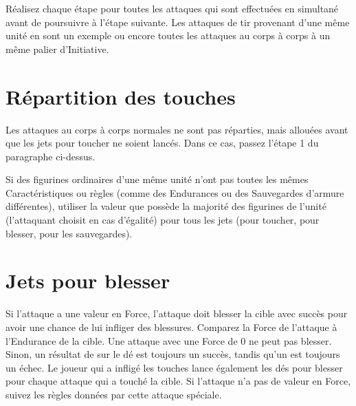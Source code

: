 Réalisez chaque étape pour toutes les attaques qui sont effectuées en simultané avant de poursuivre à l'étape suivante. Les attaques de tir provenant d'une même unité en sont un exemple ou encore toutes les attaques au corps à corps à un même palier d'Initiative.

\section{Répartition des touches}


Les attaques au corps à corps normales ne sont pas réparties, mais allouées avant que les jets pour toucher ne soient lancés. Dans ce cas, passez l'étape 1 du paragraphe ci-dessus. 

Si des figurines ordinaires d'une même unité n'ont pas toutes les mêmes Caractéristiques ou règles (comme des Endurances ou des Sauvegardes d'armure différentes), utiliser la valeur que possède la majorité des figurines de l’unité (l'attaquant choisit en cas d'égalité) pour tous les jets (pour toucher, pour blesser, pour les sauvegardes).

\section{Jets pour blesser}

Si l'attaque a une valeur en Force, l'attaque doit blesser la cible avec succès pour avoir une chance de lui infliger des blessures. Comparez la Force de l'attaque à l'Endurance de la cible. Une attaque avec une Force de 0 ne peut pas blesser. Sinon, un résultat de  sur le dé est toujours un succès, tandis qu'un  est toujours un échec. Le joueur qui a infligé les touches lance également les dés pour blesser pour chaque attaque qui a touché la cible. Si l'attaque n'a pas de valeur en Force, suivez les règles données par cette attaque spéciale. 

